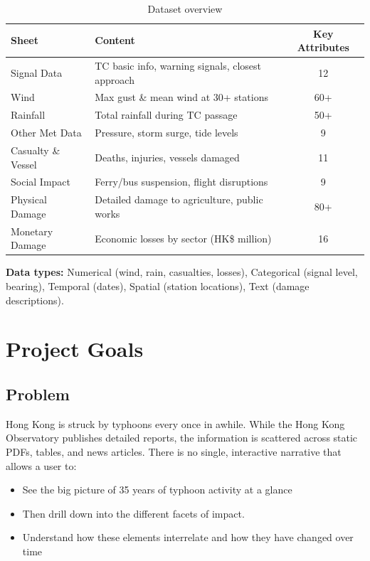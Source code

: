 \documentclass[a4paper,12pt]{article}
\begin{document}
\begin{table}[h!]
\centering
\caption{Dataset overview}
\label{tab:dataset}
\begin{tabular}{@{} l l c @{}}
\toprule
\textbf{Sheet} & \textbf{Content} & \textbf{Key Attributes} \\
\midrule
Signal Data & TC basic info, warning signals, closest approach & 12 \\
Wind & Max gust \& mean wind at 30+ stations & 60+ \\
Rainfall & Total rainfall during TC passage & 50+ \\
Other Met Data & Pressure, storm surge, tide levels & 9 \\
Casualty \& Vessel & Deaths, injuries, vessels damaged & 11 \\
Social Impact & Ferry/bus suspension, flight disruptions & 9 \\
Physical Damage & Detailed damage to agriculture, public works & 80+ \\
Monetary Damage & Economic losses by sector (HK\$ million) & 16 \\
\bottomrule
\end{tabular}
\end{table}

\textbf{Data types:} Numerical (wind, rain, casualties, losses), Categorical (signal level, bearing), Temporal (dates), Spatial (station locations), Text (damage descriptions).

\section{Project Goals}

\subsection{Problem}

Hong Kong is struck by typhoons every once in awhile. While the Hong Kong Observatory publishes detailed reports, the information is scattered across static PDFs, tables, and news articles. There is no single, interactive narrative that allows a user to:
\begin{itemize}
    \item See the big picture of 35 years of typhoon activity at a glance
    \item Then drill down into the different facets of impact.
    \item Understand how these elements interrelate and how they have changed over time
\end{itemize}
\end{document}
